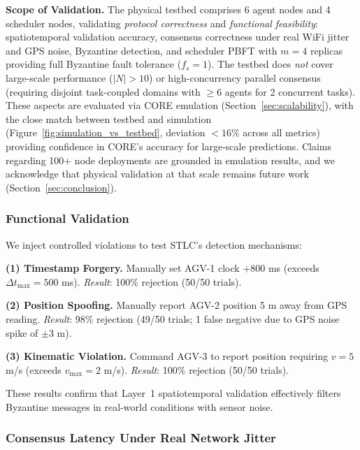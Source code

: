 \documentclass[manuscript,screen,review]{acmart}
\begin{document}
\textbf{Scope of Validation.} The physical testbed comprises 6 agent nodes and 4 scheduler nodes, validating \textit{protocol correctness} and \textit{functional feasibility}: spatiotemporal validation accuracy, consensus correctness under real WiFi jitter and GPS noise, Byzantine detection, and scheduler PBFT with $m = 4$ replicas providing full Byzantine fault tolerance ($f_s = 1$). The testbed does \emph{not} cover large-scale performance ($|N| > 10$) or high-concurrency parallel consensus (requiring disjoint task-coupled domains with $\geq 6$ agents for 2 concurrent tasks). These aspects are evaluated via CORE emulation (Section~\ref{sec:scalability}), with the close match between testbed and simulation (Figure~\ref{fig:simulation_vs_testbed}, deviation $< 16\%$ across all metrics) providing confidence in CORE's accuracy for large-scale predictions. Claims regarding 100+ node deployments are grounded in emulation results, and we acknowledge that physical validation at that scale remains future work (Section~\ref{sec:conclusion}).

\subsubsection{Functional Validation}
\label{sec:functional_validation}
\label{sec:testbed_validation}

We inject controlled violations to test STLC's detection mechanisms:

\textbf{(1) Timestamp Forgery.} Manually set AGV-1 clock $+800$ ms (exceeds $\Delta t_{\max} = 500$ ms). \textit{Result}: 100\% rejection (50/50 trials).

\textbf{(2) Position Spoofing.} Manually report AGV-2 position 5 m away from GPS reading. \textit{Result}: 98\% rejection (49/50 trials; 1 false negative due to GPS noise spike of $\pm 3$ m).

\textbf{(3) Kinematic Violation.} Command AGV-3 to report position requiring $v = 5$ m/s (exceeds $v_{\max} = 2$ m/s). \textit{Result}: 100\% rejection (50/50 trials).

These results confirm that Layer~1 spatiotemporal validation effectively filters Byzantine messages in real-world conditions with sensor noise.

\subsubsection{Consensus Latency Under Real Network Jitter}
\label{sec:consensus_latency_testbed}
\end{document}

